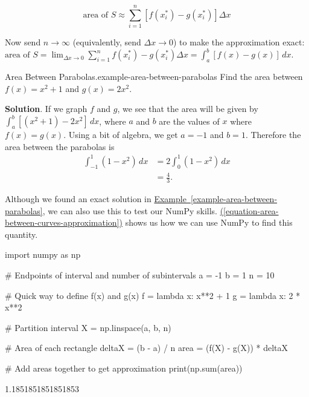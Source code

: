 \documentclass[10pt,]{book}
\numberwithin{equation}{section}
\newcommand{\amp}{&}
\begin{document}
\begin{equation}
\text{area of }S \approx \sum_{i=1}^{n}[f(x_{i}^{*}) - g(x_{i}^{*})]\Delta x\label{equation-area-between-curves-approximation}
\end{equation}
%
\par
\hypertarget{p-616}{}%
Now send \(n\to\infty\) (equivalently, send \(\Delta x\to 0\)) to make the approximation exact: \(\text{area of }S = \lim_{\Delta x\to0}\sum_{i=1}^{n}f(x_{i}^{*}) - g(x_{i}^{*})\Delta x = \int_{a}^{b}[f(x) - g(x)]\,dx.\)%
\begin{example}{Area Between Parabolas.}{example-area-between-parabolas}%
\hypertarget{p-617}{}%
Find the area between \(f(x) = x^{2} + 1\) and \(g(x) = 2x^{2}\).%
\par\smallskip%
\noindent\textbf{Solution}.\hypertarget{solution-134}{}\quad%
\hypertarget{p-618}{}%
If we graph \(f\) and \(g\), we see that the area will be given by \(\int_{a}^{b}[(x^{2} + 1) - 2x^{2}]\,dx\), where \(a\) and \(b\) are the values of \(x\) where \(f(x) = g(x)\). Using a bit of algebra, we get \(a = -1\) and \(b = 1\). Therefore the area between the parabolas is%
\begin{align*}
\int_{-1}^{1}(1 - x^{2})\,dx \amp = 2\int_{0}^{1}(1-x^{2})\,dx \\
\amp = \frac{4}{3}. 
\end{align*}
%
\end{example}
\hypertarget{p-619}{}%
Although we found an exact solution in \hyperref[example-area-between-parabolas]{Example~\ref{example-area-between-parabolas}}, we can also use this to test our NumPy skills. \hyperref[equation-area-between-curves-approximation]{(\ref{equation-area-between-curves-approximation})} shows us how we can use NumPy to find this quantity.%
\begin{sageinput}
import numpy as np

# Endpoints of interval and number of subintervals
a = -1
b = 1
n = 10

# Quick way to define f(x) and g(x)
f = lambda x: x**2 + 1
g = lambda x: 2 * x**2

# Partition interval
X = np.linspace(a, b, n)

# Area of each rectangle
deltaX = (b - a) / n
area = (f(X) - g(X)) * deltaX

# Add areas together to get approximation
print(np.sum(area))
\end{sageinput}
\begin{sageoutput}
1.1851851851851853
\end{sageoutput}
\end{document}
